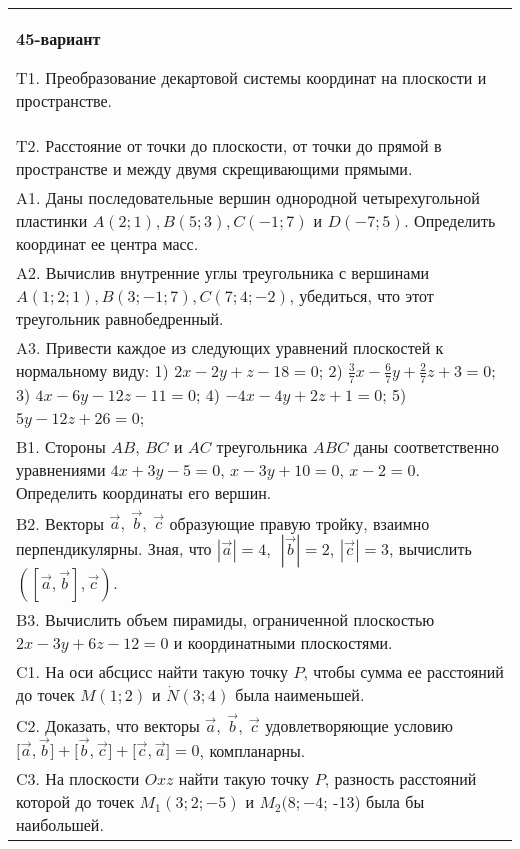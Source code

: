 \documentclass{article}
\begin{document}
\begin{tabular}{m{17cm}}
\textbf{45-вариант}
\newline

T1. 
Преобразование декартовой системы координат на плоскости и пространстве. \\
T2. 
Расстояние от точки до плоскости, от точки до прямой в пространстве и между двумя скрещивающими прямыми. \\
A1. 
Даны последовательные вершин однородной четырехугольной пластинки \(A(2;1),B(5;3),C( - 1;7)\) и \(D( - 7;5)\). Определить координат ее центра масс.
 \\
A2. 
Вычислив внутренние углы треугольника с вершинами \(A(1;2;1),B(3; - 1;7),C(7;4; - 2)\), убедиться, что этот треугольник равнобедренный.
 \\
A3. 
Привести каждое из следующих уравнений плоскостей к нормальному виду: 1) \(2x - 2y + z - 18 = 0\); 2) \(\frac{3}{7}x - \frac{6}{7}y + \frac{2}{7}z + 3 = 0\); 3) \(4x - 6y - 12z - 11 = 0\); 4) \(- 4x - 4y + 2z + 1 = 0\); 5) \(5y - 12z + 26 = 0\);
 \\
B1. 
Стороны \(AB\), \(BC\) и \(AC\) треугольника \(ABC\) даны соответственно уравнениями \(4x + 3y - 5 = 0\), \(x - 3y + 10 = 0\), \(x - 2 = 0\). Определить координаты его вершин.
 \\
B2. 
Векторы \(\overrightarrow{a},\ \overrightarrow{b},\ \overrightarrow{c}\) образующие правую тройку, взаимно перпендикулярны. Зная, что \(|\overrightarrow{a}| = 4,\ \ |\overrightarrow{b}| = 2\), \(|\overrightarrow{c}| = 3\), вычислить \(\left( \left\lbrack \overrightarrow{a},\overrightarrow{b} \right\rbrack,\overrightarrow{c} \right)\).
 \\
B3. 
Вычислить объем пирамиды, ограниченной плоскостью \(2x - 3y + 6z - 12 = 0\) и координатными плоскостями.
 \\
C1. 
На оси абсцисс найти такую точку \(P\), чтобы сумма ее расстояний до точек \(M(1;2)\) и \(\dot{N}(3;4)\) была наименьшей.
 \\
C2. 
Доказать, что векторы \(\overrightarrow{a},\ \overrightarrow{b},\ \overrightarrow{c}\) удовлетворяющие условию \(\lbrack\overrightarrow{a},\overrightarrow{b}\rbrack + \lbrack\overrightarrow{b},\overrightarrow{c}\rbrack + \lbrack\overrightarrow{c},\overrightarrow{a}\rbrack = 0\), компланарны.
 \\
C3. 
На плоскости \(Oxz\) найти такую точку \(P\), разность расстояний которой до точек \(M_{1}(3;2; - 5)\) и \(M_{2}(8; - 4\); -13) была бы наибольшей.
 \\

\end{tabular}
\vspace{1cm}
\end{document}
